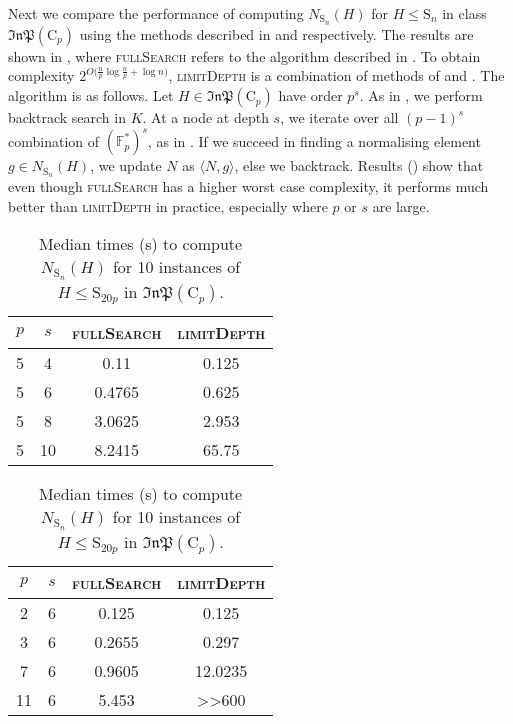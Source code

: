 \documentclass[11pt,a4paper]{article}
\theoremstyle{definition}
\theoremstyle{remark}
\newcommand{\InP}{\mathfrak{InP}}
\newcommand{\Sy}{\mathrm{S}}
\newcommand{\Cy}{\mathrm{C}}
\begin{document}
Next we compare the performance of computing $N_{\Sy_n}(H)$ for $H \leq \Sy_n$ in class $\InP(\Cy_p)$ using the methods described in   and  respectively. 
The results are shown in , where \textsc{fullSearch} refers to the algorithm described in . 
To obtain complexity $2^{O(\frac{n}{p} \log{\frac{n}{p} + \log{n})}}$, \textsc{limitDepth} is a combination of methods of  and . The algorithm is as follows. 
Let $H \in \InP(\Cy_p)$ have order $p^s$. 
As in , we perform backtrack search in $K$.
At a node at depth $s$, we iterate over all $(p-1)^s$ combination of $(\mathds{F}_p^*)^s$, as in .  
If we succeed in finding a normalising element $g \in N_{\Sy_n}(H)$, we update $N$ as $\langle N,g \rangle$, else we backtrack.
Results () show that even though \textsc{fullSearch} has a higher worst case complexity, it performs 
much better than \textsc{limitDepth} in practice, especially where $p$ or $s$ are large.
\begin{table}[ht!]
\centering
\begin{minipage}{.45\linewidth}
\begin{tabular}{cccc}
\hline
$p$ & $s$ & \textsc{fullSearch}& \textsc{limitDepth} \\
\hline
5 & 4 &	0.11 &	0.125 \\ 
5 & 6 &	0.4765 & 0.625 \\
5 & 8 &	3.0625 & 2.953 \\
5 & 10 & 8.2415 & 65.75 \\
\hline
\end{tabular} 
\end{minipage}
\quad
\begin{minipage}{.45\linewidth}
\begin{tabular}{cccc}
\hline
$p$ & $s$& \textsc{fullSearch}& \textsc{limitDepth} \\
\hline
2 & 6 & 0.125 &	0.125\\
3 & 6 & 0.2655 & 0.297\\
7 & 6 &	0.9605 & 12.0235 \\
11 & 6 & 5.453 & >>600 \\
\hline
\end{tabular}
\end{minipage}
\caption{Median times (s) to compute $N_{\Sy_n}(H)$ for 10 instances of $H \leq \Sy_{20p}$ in $\InP(\Cy_p)$. }
\label{fig:limitDepthvsReduceBranchings}
\end{table}
\end{document}
